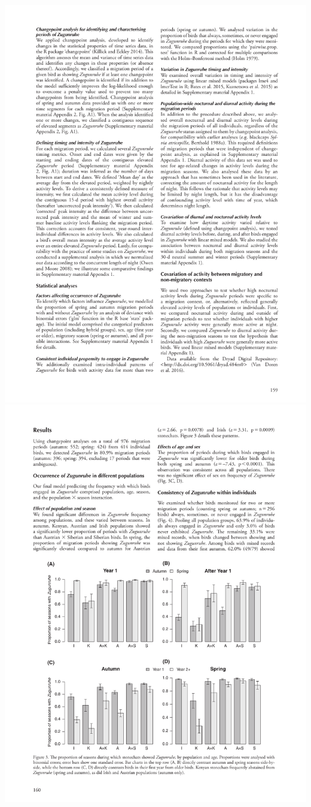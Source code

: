 \documentclass[a4paper, twoside]{templates/ociamthesis}
\begin{document}
\includegraphics[width=1\linewidth]{pdf_chapters/zug/zug_crop_Part05}
\includegraphics[width=1\linewidth]{pdf_chapters/zug/zug_crop_Part06}
\end{document}
